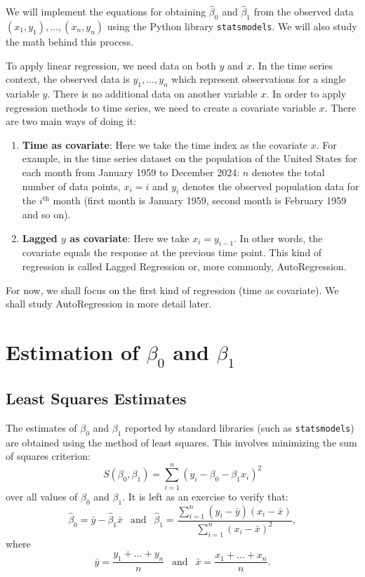 \documentclass{scrartcl}
\begin{document}
We will implement the equations for obtaining $\hat{\beta}_0$ and
$\hat{\beta}_1$ from the 
observed data $(x_1, y_1), \dots, (x_n, y_n)$ using the Python library
\texttt{statsmodels}. We will also study the math behind
this process. 

To apply linear regression, we need data on both $y$ and $x$. In the
time series context, the observed data is $y_1, \dots, y_n$ which
represent observations for a single variable $y$. There is no
additional data on another variable $x$. In order to apply regression
methods to time series, we need to create a covariate variable
$x$. There are two main ways of doing it:
\begin{enumerate}
\item \textbf{Time as covariate}: Here we take the time index as the
  covariate $x$.  For example, in the time series dataset on the
population of the United States for each month from January 1959 to
December 2024: $n$ denotes the total number of data points, $x_i = i$
and $y_i$ denotes the observed population data for the $i^{\text{th}}$
month (first month is January 1959, second month is February 1959 and
so on).
\item \textbf{Lagged $y$ as covariate}: Here we take $x_i =
  y_{i-1}$. In other words, the covariate equals the response at the
  previous time point. This kind of regression is called Lagged
  Regression or, more commonly, AutoRegression. 
\end{enumerate}
For now, we shall focus on the first kind of regression (time as
covariate). We shall study AutoRegression in more detail later.

\section{Estimation of $\beta_0$ and $\beta_1$}

\subsection{Least Squares Estimates}

The estimates of $\beta_0$ and $\beta_1$ reported by standard
libraries (such as \texttt{statsmodels}) are obtained using the method
of least squares. This involves minimizing the sum of squares
criterion:
\begin{equation}\label{ss}
  S(\beta_0, \beta_1) = \sum_{i=1}^n \left(y_i - \beta_0 - \beta_1 x_i
  \right)^2 
\end{equation}
over all values of $\beta_0$ and $\beta_1$. It is left as an exercise
to verify that: 
\begin{equation*}
  \hat{\beta}_0 = \bar{y} - \hat{\beta}_1 \bar{x}  ~~ \text{ and } ~~
  \hat{\beta}_1 = \frac{\sum_{i=1}^n (y_i - \bar{y})(x_i -
    \bar{x})}{\sum_{i=1}^n (x_i - \bar{x})^2}, 
\end{equation*}
where
\begin{equation*}
  \bar{y} = \frac{y_1 + \dots + y_n}{n} ~~ \text{ and } ~~   \bar{x} =
  \frac{x_1 + \dots + x_n}{n}. 
\end{equation*}
\end{document}
